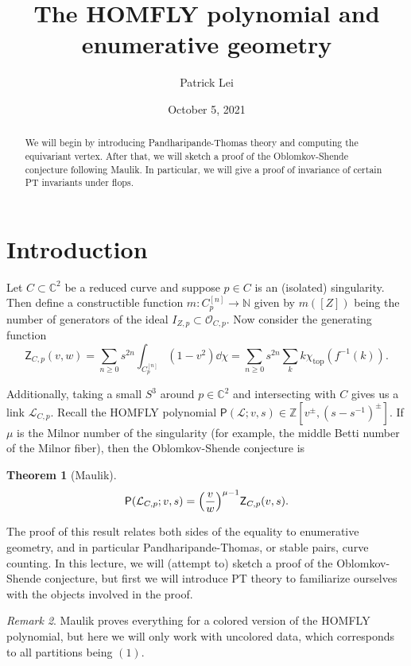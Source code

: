 \documentclass{amsart}
\title{The HOMFLY polynomial and enumerative geometry}
\author{Patrick Lei}
\date{October 5, 2021}
\newtheorem{thm}{Theorem}[section]
\theoremstyle{definition}
\theoremstyle{remark}
\newtheorem{rmk}[thm]{Remark}
\theoremstyle{plain}
\theoremstyle{definition}
\theoremstyle{remark}
\newcommand{\N}{\mathbb{N}}
\newcommand{\C}{\mathbb{C}}
\newcommand{\Z}{\mathbb{Z}}
\newcommand{\mc}[1]{\mathcal{#1}}
\newcommand{\mr}[1]{\mathrm{#1}}
\newcommand{\ms}[1]{\mathsf{#1}}
\newcommand{\1}{\mathbf{1}}
\newcommand{\2}{\mathbf{2}}
\newcommand{\3}{\mathbf{3}}
\begin{document}
    
\maketitle

\begin{abstract}
    We will begin by introducing Pandharipande-Thomas theory and computing the equivariant vertex. After that, we will sketch a proof of the Oblomkov-Shende conjecture following Maulik. In particular, we will give a proof of invariance of certain PT invariants under flops.
\end{abstract}

\section{Introduction}%
\label{sec:introduction}

Let $C \subset \C^2$ be a reduced curve and suppose $p \in C$ is an (isolated) singularity. Then define a constructible function $m \colon C_p^{[n]} \to \N$ given by $m([Z])$ being the number of generators of the ideal $I_{Z,p} \subset \mc{O}_{C,p}$. Now consider the generating function
\[ \ms{Z}_{C,p}(v, w) = \sum_{n \geq 0} s^{2n} \int_{C_p^{[n]}} (1-v^2) \dd{\chi} = \sum_{n \geq 0} s^{2n} \sum_k k \chi_{\mr{top}}(f^{-1}(k)). \]

Additionally, taking a small $S^3$ around $p \in \C^2$ and intersecting with $C$ gives us a link $\mc{L}_{C,p}$. Recall the HOMFLY polynomial $\ms{P}(\mc{L}; v, s) \in \Z[v^{\pm}, {(s-s^{-1})}^{\pm}]$. If $\mu$ is the Milnor number of the singularity (for example, the middle Betti number of the Milnor fiber), then the Oblomkov-Shende conjecture is
\begin{thm}[Maulik]
    \[ \ms{P}(\mc{L}_{C,p}; v,s) = {\qty(\frac{v}{w})}^{\mu - 1} \ms{Z}_{C,p}(v,s). \]
\end{thm}

The proof of this result relates both sides of the equality to enumerative geometry, and in particular Pandharipande-Thomas, or stable pairs, curve counting. In this lecture, we will (attempt to) sketch a proof of the Oblomkov-Shende conjecture, but first we will introduce PT theory to familiarize ourselves with the objects involved in the proof.

\begin{rmk}
    Maulik proves everything for a colored version of the HOMFLY polynomial, but here we will only work with uncolored data, which corresponds to all partitions being $(1)$.
\end{rmk}
\end{document}
